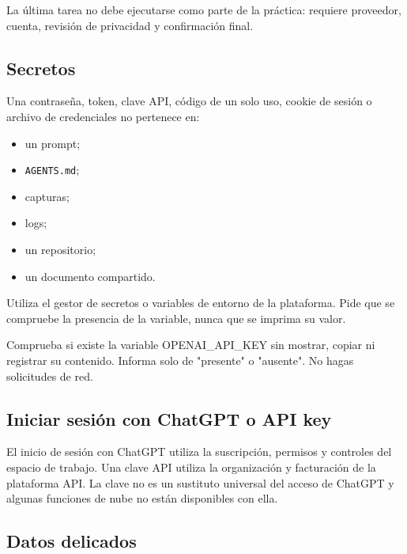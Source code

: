 \documentclass[10pt,a4paper,openany]{book}
\providecommand{\tightlist}{\setlength{\itemsep}{0.18em}\setlength{\parskip}{0pt}}
\newenvironment{Shaded}{}{}
\newcommand{\NormalTok}[1]{#1}
\renewenvironment{Shaded}
  {\begin{tcolorbox}[
    enhanced,
    breakable,
    colback=CodeBg,
    colframe=Border,
    boxrule=0.5pt,
    arc=2mm,
    left=3mm,
    right=3mm,
    top=2.2mm,
    bottom=2.2mm,
    before skip=0.8em,
    after skip=0.9em
  ]}
  {\end{tcolorbox}}
\begin{document}
La última tarea no debe ejecutarse como parte de la práctica: requiere
proveedor, cuenta, revisión de privacidad y confirmación final.

\subsection{Secretos}\label{secretos}

Una contraseña, token, clave API, código de un solo uso, cookie de
sesión o archivo de credenciales no pertenece en:

\begin{itemize}
\tightlist
\item
  un prompt;
\item
  \texttt{AGENTS.md};
\item
  capturas;
\item
  logs;
\item
  un repositorio;
\item
  un documento compartido.
\end{itemize}

Utiliza el gestor de secretos o variables de entorno de la plataforma.
Pide que se compruebe la presencia de la variable, nunca que se imprima
su valor.

\begin{Shaded}
\begin{Highlighting}[]
\NormalTok{Comprueba si existe la variable OPENAI\_API\_KEY sin mostrar, copiar ni registrar}
\NormalTok{su contenido. Informa solo de "presente" o "ausente". No hagas solicitudes de red.}
\end{Highlighting}
\end{Shaded}

\subsection{Iniciar sesión con ChatGPT o API
key}\label{iniciar-sesiuxf3n-con-chatgpt-o-api-key}

El inicio de sesión con ChatGPT utiliza la suscripción, permisos y
controles del espacio de trabajo. Una clave API utiliza la organización
y facturación de la plataforma API. La clave no es un sustituto
universal del acceso de ChatGPT y algunas funciones de nube no están
disponibles con ella.

\subsection{Datos delicados}\label{datos-delicados}
\end{document}
